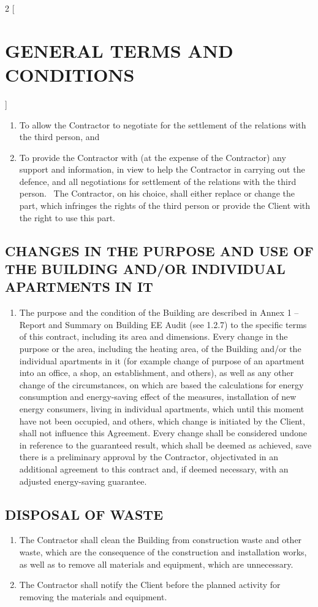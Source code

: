 \begin{multicols}{2} [\section{GENERAL TERMS AND CONDITIONS}]
\begin{enumerate}
        agreement with him.
      \item To allow the Contractor to negotiate for the settlement of
        the relations with the third person, and
      \item To provide the Contractor with (at the expense of the
        Contractor) any support and information, in view to help the
        Contractor in carrying out the defence, and all negotiations
        for settlement of the relations with the third person.  \ The
        Contractor, on his choice, shall either replace or change the
        part, which infringes the rights of the third person or
        provide the Client with the right to use this part.
      \end{enumerate}

    \subsection{CHANGES IN THE PURPOSE AND USE OF THE BUILDING AND/OR
      INDIVIDUAL APARTMENTS IN IT}
    \begin{enumerate}
    \item The purpose and the condition of the Building are described
      in Annex 1 – Report and Summary on Building EE Audit (see 1.2.7)
      to the specific terms of this contract, including its area and
      dimensions. Every change in the purpose or the area, including
      the heating area, of the Building and/or the individual
      apartments in it (for example change of purpose of an apartment
      into an office, a shop, an establishment, and others), as well
      as any other change of the circumstances, on which are based the
      calculations for energy consumption and energy-saving effect of
      the measures, installation of new energy consumers, living in
      individual apartments, which until this moment have not been
      occupied, and others, which change is initiated by the Client,
      shall not influence this Agreement. Every change shall be
      considered undone in reference to the guaranteed result, which
      shall be deemed as achieved, save there is a preliminary
      approval by the Contractor, objectivated in an additional
      agreement to this contract and, if deemed necessary, with an
      adjusted energy-saving guarantee.
    \end{enumerate}

    \subsection{DISPOSAL OF WASTE}
    \begin{enumerate}
    \item The Contractor shall clean the Building from construction
      waste and other waste, which are the consequence of the
      construction and installation works, as well as to remove all
      materials and equipment, which are unnecessary.
    \item The Contractor shall notify the Client before the planned
      activity for removing the materials and equipment.
    \end{enumerate}


\end{multicols}
